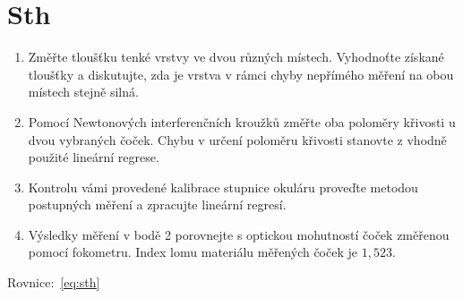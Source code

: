 \documentclass{protokol}
\begin{document}
    \section*{Sth}

    \begin{enumerate}
      \item Změřte tloušťku tenké vrstvy ve dvou různých místech. Vyhodnoťte získané tloušťky a diskutujte, zda je vrstva v rámci chyby nepřímého měření na obou místech stejně silná.
      \item Pomocí Newtonových interferenčních kroužků změřte oba poloměry křivosti u dvou vybraných čoček. Chybu v určení poloměru křivosti stanovte z vhodně použité lineární regrese.
      \item Kontrolu vámi provedené kalibrace stupnice okuláru proveďte metodou postupných měření a zpracujte lineární regresí.
      \item Výsledky měření v bodě 2 porovnejte s optickou mohutností čoček změřenou pomocí fokometru. Index lomu materiálu měřených čoček je $1,523$.
    \end{enumerate}

    Rovnice:~\eqref{eq:sth}

    
    
  
\end{document}

